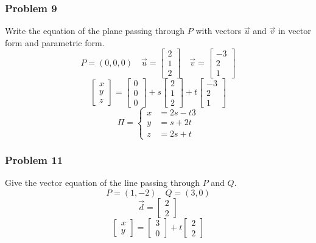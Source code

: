 \documentclass[letterpaper, 12pt]{math}
\begin{document}
\subsubsection*{Problem 9}
Write the equation of the plane passing through \( P \) with vectors \( \vec{u}
\) and \( \vec{v} \) in vector form and parametric form.
\[ P = (0,0,0) \quad \vec{u} = \begin{bmatrix}2 \\ 1 \\ 2\end{bmatrix} \quad
  \vec{v} = \begin{bmatrix}-3 \\ 2 \\ 1\end{bmatrix} \]
\[ \begin{bmatrix}x \\ y \\ z\end{bmatrix} =
  \begin{bmatrix}0 \\ 0 \\ 0\end{bmatrix}+
  s\begin{bmatrix}2 \\ 1 \\ 2\end{bmatrix}+
  t\begin{bmatrix}-3 \\ 2 \\ 1\end{bmatrix} \]
\[ \Pi = \begin{cases}
  x &= 2s-t3 \\
  y &= s+2t \\
  z &= 2s+t
\end{cases} \]

\subsubsection*{Problem 11}
Give the vector equation of the line passing through \( P \) and \( Q \).
\[ P = (1,-2) \quad Q = (3,0) \]
\[ \vec{d} = \begin{bmatrix}2 \\ 2\end{bmatrix} \]
\[ \begin{bmatrix}x \\ y\end{bmatrix} = \begin{bmatrix}3 \\ 0\end{bmatrix}+
  t\begin{bmatrix}2 \\ 2\end{bmatrix} \]
\end{document}
